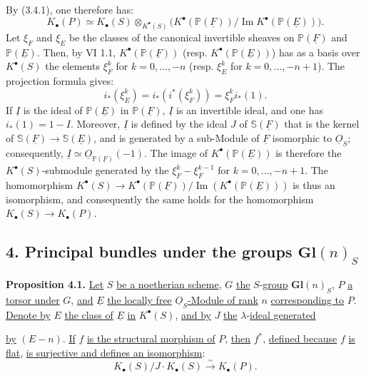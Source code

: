 By (3.4.1), one therefore has:
\[
K_\bullet(P)\simeq K_\bullet(S)\otimes_{K^{\bullet}(S)}
\bigl(K^{\bullet}(\mathbb P(\underline{F}))/\operatorname{Im}K^{\bullet}(\mathbb P(\underline{E}))\bigr).
\]
Let $\xi_F$ and $\xi_E$ be the classes of the canonical invertible sheaves on $\mathbb P(\underline{F})$ and $\mathbb P(\underline{E})$. Then, by VI 1.1, $K^{\bullet}(\mathbb P(\underline{F}))$ (resp. $K^{\bullet}(\mathbb P(\underline{E}))$) has as a basis over $K^{\bullet}(S)$ the elements $\xi_F^k$ for $k=0,\ldots,-n$ (resp. $\xi_E^k$ for $k=0,\ldots,-n+1$). The projection formula gives:
\[
i_*(\xi_E^k)=i_*(i^*(\xi_F^k))=\xi_F^k i_*(1).
\]
If $\underline{I}$ is the ideal of $\mathbb P(\underline{E})$ in $\mathbb P(\underline{F})$, $\underline{I}$ is an invertible ideal, and one has $i_*(1)=1-I$. Moreover, $\underline{I}$ is defined by the ideal $J$ of $\mathbb S(\underline{F})$ that is the kernel of $\mathbb S(\underline{F})\to \mathbb S(\underline{E})$, and is generated by a sub-Module of $\underline{F}$ isomorphic to $\underline{O}_S$; consequently, $\underline{I}\simeq \underline{O}_{\mathbb P(\underline{F})}(-1)$. The image of $K^{\bullet}(\mathbb P(\underline{E}))$ is therefore the $K^{\bullet}(S)$-submodule generated by the $\xi_F^k-\xi_F^{k-1}$ for $k=0,\ldots,-n+1$. The homomorphism $K^{\bullet}(S)\longrightarrow K^{\bullet}(\mathbb P(\underline{F}))/\operatorname{Im}(K^{\bullet}(\mathbb P(\underline{E})))$ is thus an isomorphism, and consequently the same holds for the homomorphism $K_\bullet(S)\to K_\bullet(P)$.

\subsection*{4. Principal bundles under the groups $\mathbf{Gl}(n)_S$}

\textbf{Proposition 4.1.} \uline{Let} $S$ \uline{be a noetherian scheme}, $G$ \uline{the} $S$-\uline{group} $\mathbf{Gl}(n)_S$, $P$ \uline{a torsor under} $G$, \uline{and} $\underline{E}$ \uline{the locally free} $\underline{O}_S$\uline{-Module of rank} $n$ \uline{corresponding to} $P$. \uline{Denote by} $E$ \uline{the class of} $\underline{E}$ \uline{in} $K^{\bullet}(S)$, \uline{and by} $J$ \uline{the} $\lambda$-\uline{ideal generated}


%

\uline{by} $(E-n)$. \uline{If} $f$ \uline{is the structural morphism of} $P$, \uline{then} $f^*$, \uline{defined because} $f$ \uline{is flat}, \uline{is surjective and defines an isomorphism}:
\[
K_\bullet(S)/J\cdot K_\bullet(S)\xrightarrow{\sim}K_\bullet(P).
\]

